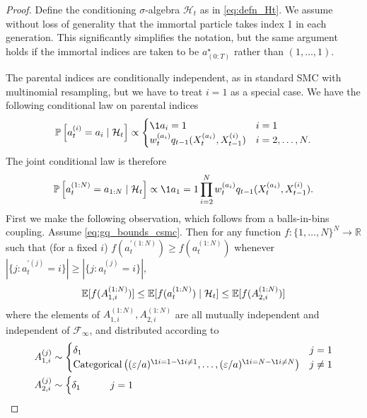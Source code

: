 \begin{proof}
Define the conditioning $\sigma$-algebra $\mathcal{H}_t$ as in \eqref{eq:defn_Ht}.
We assume without loss of generality that the immortal particle takes index 1 in each generation. This significantly simplifies the notation, but the same argument holds if the immortal indices are taken to be $a_{(0:T)}^\star$ rather than $(1,\dots,1)$.

The parental indices are conditionally independent, as in standard SMC with multinomial resampling, but we have to treat $i=1$ as a special case. We have the following conditional law on parental indices
\begin{equation*}
\Prob \left[ a_t^{(i)} = a_i \mid \mathcal{H}_t \right] \propto
\begin{cases}
\1{a_i=1} &i=1 \\
w_t^{(a_i)} q_{t-1}(X_t^{(a_i)}, X_{t-1}^{(i)}) &i=2,\dots,N .
\end{cases}
\end{equation*}
The joint conditional law is therefore
\begin{equation*}
\Prob \left[ a_t^{(1:N)} = a_{1:N} \mid \mathcal{H}_t \right] \propto \1{a_1 = 1} \prod_{i=2}^N w_t^{(a_i)} q_{t-1}(X_t^{(a_i)}, X_{t-1}^{(i)}).
\end{equation*}
First we make the following observation, which follows from a balls-in-bins coupling.
Assume \eqref{eq:gq_bounds_csmc}. 
Then for any function $f:\{1,\dots,N\}^N \to \mathbb{R}$ such that (for a fixed $i$) $f(a_t^{\prime(1:N)}) \geq f(a_t^{(1:N)})$ whenever $|\{j:a_t^{\prime(j)}=i\}| \geq |\{j:a_t^{(j)}=i\}|$,
\begin{equation}\label{eq:csmc_f_bound}
\mathbb{E}[ f(A_{1,i}^{(1:N)}) ] 
\leq \mathbb{E}[ f(a_t^{(1:N)}) \mid \mathcal{H}_t ]
\leq \mathbb{E}[ f(A_{2,i}^{(1:N)}) ] 
\end{equation}
where the elements of $A_{1,i}^{(1:N)}, A_{2,i}^{(1:N)}$ are all mutually independent and independent of $\mathcal{F}_{\infty}$, and distributed according to
\begin{align*}
& A_{1,i}^{(j)} \sim \begin{cases}
\delta_1 \qquad & j=1 \\
\operatorname{Categorical}\left( (\varepsilon/a)^{\1{i=1} -\1{i\neq 1}} ,\dots, (\varepsilon/a)^{\1{i=N} -\1{i\neq N}} \right) & j\neq 1 
\end{cases} \\
& A_{2,i}^{(j)} \sim \begin{cases}
\delta_1 \qquad & j=1\\

\end{cases}
\end{align*}
\end{proof}
